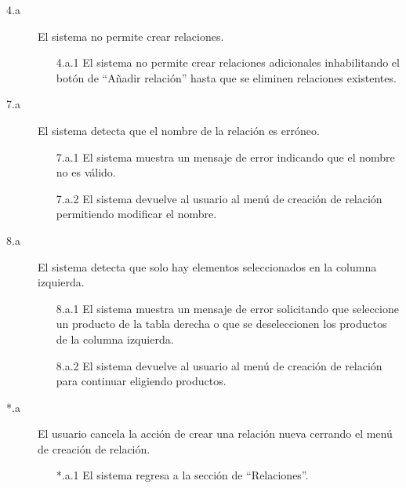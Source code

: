\begin{description}

    \item[4.a] El sistema no permite crear relaciones.
    \begin{enumerate}
        \item[4.a.1] El sistema no permite crear relaciones adicionales inhabilitando el botón de \enquote{Añadir relación} hasta que se eliminen relaciones existentes.
    \end{enumerate}
    
    \item[7.a] El sistema detecta que el nombre de la relación es erróneo.
    \begin{enumerate}
        \item[7.a.1] El sistema muestra un mensaje de error indicando que el nombre no es válido.
        \item[7.a.2] El sistema devuelve al usuario al menú de creación de relación permitiendo modificar el nombre.
    \end{enumerate}
    
    \item[8.a] El sistema detecta que solo hay elementos seleccionados en la columna izquierda.
    \begin{enumerate}
        \item[8.a.1] El sistema muestra un mensaje de error solicitando que seleccione un producto de la tabla derecha o que se deseleccionen los productos de la columna izquierda.
        \item[8.a.2] El sistema devuelve al usuario al menú de creación de relación para continuar eligiendo productos.
    \end{enumerate}

    \item[*.a] El usuario cancela la acción de crear una relación nueva cerrando el menú de creación de relación.
    \begin{enumerate}
        \item[*.a.1] El sistema regresa a la sección de \enquote{Relaciones}.
    \end{enumerate}
\end{description}

